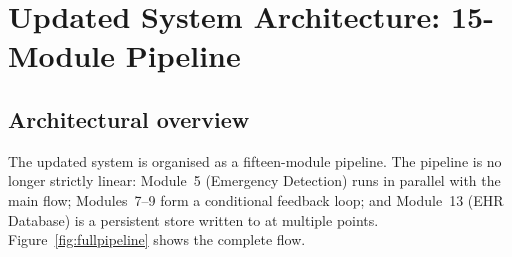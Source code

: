 \documentclass[12pt,a4paper]{article}
\begin{document}
\section{Updated System Architecture: 15-Module Pipeline}
\label{sec:architecture}

\subsection{Architectural overview}

The updated system is organised as a fifteen-module pipeline. The
pipeline is no longer strictly linear: Module~5 (Emergency Detection)
runs in parallel with the main flow; Modules~7--9 form a conditional
feedback loop; and Module~13 (EHR Database) is a persistent store
written to at multiple points. Figure~\ref{fig:fullpipeline} shows the
complete flow.
\end{document}
